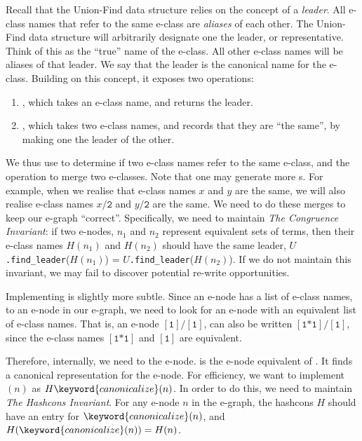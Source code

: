 Recall that the Union-Find data structure relies on the concept of a \textit{leader}. All e-class names that refer to the same e-class are 
\textit{aliases} of each other. The Union-Find data structure will arbitrarily designate one the leader, or representative. Think of this as the 
``true'' name of the e-class. All other e-class names will be aliases of that leader. 
We say that the leader is the canonical name for the e-class.
Building on this concept, it exposes two operations:
\begin{enumerate}
  \item {}, which takes an e-class name, and returns the leader.
  \item {}, which takes two e-class names, and records that they are ``the same'', by making one the leader of the other.
\end{enumerate}
We thus use  to determine if two e-class names refer to the same e-class, and the  operation to merge 
two e-classes. Note that one  may generate more s. For example, when we realise that e-class names $x$ and 
$y$ are the same, we will also realise e-class names $x \texttt{/2}$ and $y \texttt{/2}$ are the same. We need to do these merges 
to keep our e-graph ``correct''. Specifically, we need to maintain \textit{The Congruence Invariant}: if two e-nodes, $n_1$ and $n_2$ represent equivalent sets of terms, 
then their e-class names $H(n_1)$ and $H(n_2)$ should have the same leader, $U$\texttt{.find\_leader}($H(n_1)$) = $U$\texttt{.find\_leader}($H(n_2)$).
If we do not maintain this invariant, we may fail to discover potential re-write opportunities. 

Implementing  is slightly more subtle. Since an e-node has a list of e-class names, to  an e-node in our e-graph,
we need to look for an e-node with an equivalent list of e-class names. That is, an e-node $[\texttt{1}] \texttt{/} [\texttt{1}]$, can also be
written $[\texttt{1*1}] \texttt{/} [\texttt{1}]$, since the e-class names $[\texttt{1*1}]$ and $[\texttt{1}]$ are equivalent. 

Therefore, internally, we need to  the e-node.  is the e-node equivalent of . 
It finds a canonical representation for the e-node. For efficiency, we want to implement $(n)$ as $H\keyword{canonicalize}(n)$. In order to do this, 
we need to maintain \textit{The Hashcons Invariant}. For any e-node $n$ in the e-graph, the hashcons $H$ should have an entry for $\keyword{canonicalize}(n)$,
and $H(\keyword{canonicalize}(n)) = H(n)$.

